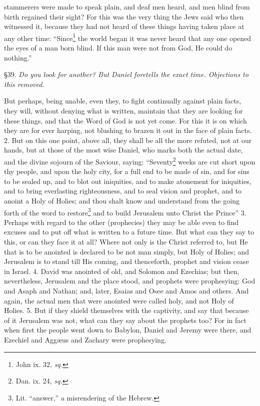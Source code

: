 stammerers were made to speak plain, and deaf men heard, and men blind from birth regained their sight? For this was the very thing the Jews said who then witnessed it, because they had not heard of these things having taken place at any other time: “Since\footnote{John ix. 32, \emph{sq.}} the world began it was never heard that any one opened the eyes of a man born blind. If this man were not from God, He could do nothing.”


§39. \emph{Do you look for another? But Daniel foretells the exact time. Objections to this removed.}

But perhaps, being unable, even they, to fight continually against plain facts, they will, without denying what is written, maintain that they are looking for these things, and that the Word of God is not yet come. For this it is on which they are for ever harping, not blushing to brazen it out in the face of plain facts. 2. But on this one point, above all, they shall be all the more refuted, not at our hands, but at those of the most wise Daniel, who marks both the actual date, and the divine sojourn of the Saviour, saying: “Seventy\footnote{Dan. ix. 24, \emph{sq.}} weeks are cut short upon thy people, and upon the holy city, for a full end to be made of sin, and for sins to be sealed up, and to blot out iniquities, and to make atonement for iniquities, and to bring everlasting righteousness, and to seal vision and prophet, and to anoint a Holy of Holies; and thou shalt know and understand from the going forth of the word to restore\footnote{Lit. “answer,” a misrendering of the Hebrew.} and to build Jerusalem unto Christ the Prince” 3. Perhaps with regard to the other (prophecies) they may be able even to find excuses and to put off what is written to a future time. But what can they say to this, or can they face it at all? Where not only is the Christ referred to, but He that is to be anointed is declared to be not man simply, but Holy of Holies; and Jerusalem is to stand till His coming, and thenceforth, prophet and vision cease in Israel. 4. David was anointed of old, and Solomon and Ezechias; but then, nevertheless, Jerusalem and the place stood, and prophets were prophesying: God and Asaph and Nathan; and, later, Esaias and Osee and Amos and others. And again, the actual men that were anointed were called holy, and not Holy of Holies. 5. But if they shield themselves with the captivity, and say that because of it Jerusalem was not, what can they say about the prophets too? For in fact when first the people went down to Babylon, Daniel and Jeremy were there, and Ezechiel and Aggæus and Zachary were prophesying.

